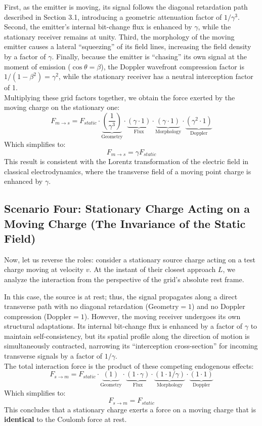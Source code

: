 \documentclass[12pt, a4paper]{article}
\begin{document}
First, as the emitter is moving, its signal follows the diagonal retardation path described in Section 3.1, introducing a geometric attenuation factor of $1/\gamma^3$. Second, the emitter’s internal bit-change flux is enhanced by $\gamma$, while the stationary receiver remains at unity. Third, the morphology of the moving emitter causes a lateral ``squeezing'' of its field lines, increasing the field density by a factor of $\gamma$. Finally, because the emitter is ``chasing'' its own signal at the moment of emission ($\cos\theta = \beta$), the Doppler wavefront compression factor is $1/(1-\beta^2) = \gamma^2$, while the stationary receiver has a neutral interception factor of 1. \\
Multiplying these grid factors together, we obtain the force exerted by the moving charge on the stationary one:
\[
F_{m \to s} = F_{static} \cdot \underbrace{\left(\frac{1}{\gamma^3}\right)}_{\text{Geometry}} \cdot \underbrace{(\gamma \cdot 1)}_{\text{Flux}} \cdot \underbrace{(\gamma \cdot 1)}_{\text{Morphology}} \cdot \underbrace{(\gamma^2 \cdot 1)}_{\text{Doppler}}
\]
Which simplifies to:
\[
F_{m \to s} = \gamma F_{static}
\]
This result is consistent with the Lorentz transformation of the electric field in classical electrodynamics, where the transverse field of a moving point charge is enhanced by $\gamma$.

\subsection{Scenario Four: Stationary Charge Acting on a Moving Charge (The Invariance of the Static Field)}

Now, let us reverse the roles: consider a stationary source charge acting on a test charge moving at velocity $v$. At the instant of their closest approach $L$, we analyze the interaction from the perspective of the grid's absolute rest frame.

In this case, the source is at rest; thus, the signal propagates along a direct transverse path with no diagonal retardation ($\text{Geometry} = 1$) and no Doppler compression ($\text{Doppler} = 1$). However, the moving receiver undergoes its own structural adaptations. Its internal bit-change flux is enhanced by a factor of $\gamma$ to maintain self-consistency, but its spatial profile along the direction of motion is simultaneously contracted, narrowing its ``interception cross-section'' for incoming transverse signals by a factor of $1/\gamma$. \\
The total interaction force is the product of these competing endogenous effects:
\[
F_{s \to m} = F_{static} \cdot \underbrace{(1)}_{\text{Geometry}} \cdot \underbrace{(1 \cdot \gamma)}_{\text{Flux}} \cdot \underbrace{(1 \cdot 1/\gamma)}_{\text{Morphology}} \cdot \underbrace{(1 \cdot 1)}_{\text{Doppler}}
\]
Which simplifies to:
\[
F_{s \to m} = F_{static}
\]
This concludes that a stationary charge exerts a force on a moving charge that is \textbf{identical} to the Coulomb force at rest.
\end{document}
